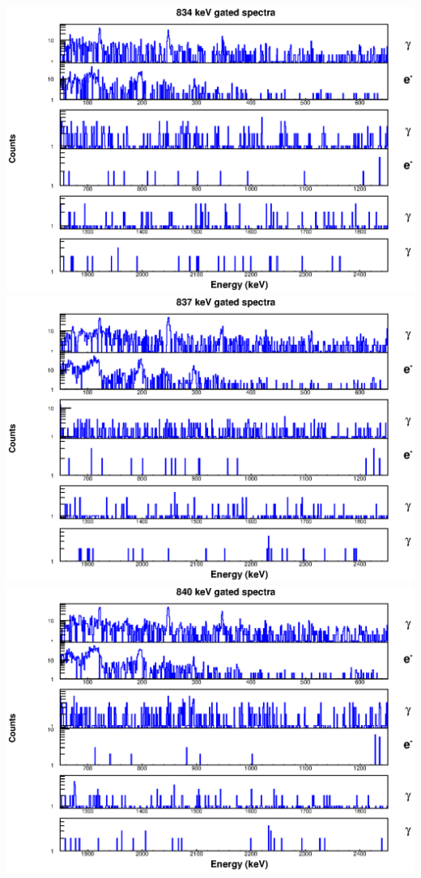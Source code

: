 \begin{landscape}
\includegraphics[scale=1.1]{154Gd_Appendix/834_combined.eps}
\includegraphics[scale=1.1]{154Gd_Appendix/837_combined.eps}
\includegraphics[scale=1.1]{154Gd_Appendix/840_combined.eps}

\end{landscape}
